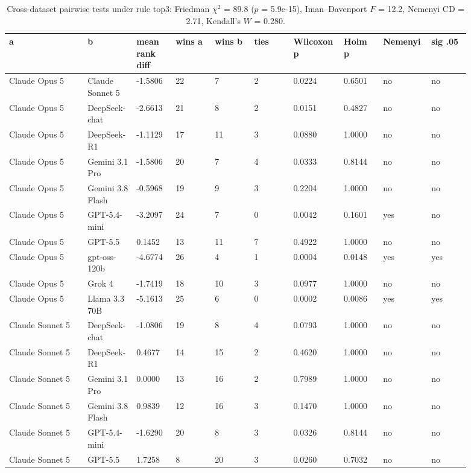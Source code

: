 \begin{landscape}
\tiny
\setlength{\tabcolsep}{3pt}
\begin{longtable}{p{0.162\linewidth}p{0.081\linewidth}p{0.081\linewidth}p{0.081\linewidth}p{0.081\linewidth}p{0.081\linewidth}p{0.081\linewidth}p{0.081\linewidth}p{0.081\linewidth}p{0.081\linewidth}}
\caption{Cross-dataset pairwise tests under rule top3: Friedman $\chi^2$ = 89.8 ($p$ = 5.9e-15), Iman--Davenport $F$ = 12.2, Nemenyi CD = 2.71, Kendall's $W$ = 0.280.}\label{tab:pairwise_top3}\\
\toprule
a & b & mean rank diff & wins a & wins b & ties & Wilcoxon p & Holm p & Nemenyi & sig .05 \\
\midrule
Claude Opus 5 & Claude Sonnet 5 & -1.5806 & 22 & 7 & 2 & 0.0224 & 0.6501 & no & no \\
Claude Opus 5 & DeepSeek-chat & -2.6613 & 21 & 8 & 2 & 0.0151 & 0.4827 & no & no \\
Claude Opus 5 & DeepSeek-R1 & -1.1129 & 17 & 11 & 3 & 0.0880 & 1.0000 & no & no \\
Claude Opus 5 & Gemini 3.1 Pro & -1.5806 & 20 & 7 & 4 & 0.0333 & 0.8144 & no & no \\
Claude Opus 5 & Gemini 3.8 Flash & -0.5968 & 19 & 9 & 3 & 0.2204 & 1.0000 & no & no \\
Claude Opus 5 & GPT-5.4-mini & -3.2097 & 24 & 7 & 0 & 0.0042 & 0.1601 & yes & no \\
Claude Opus 5 & GPT-5.5 & 0.1452 & 13 & 11 & 7 & 0.4922 & 1.0000 & no & no \\
Claude Opus 5 & gpt-oss-120b & -4.6774 & 26 & 4 & 1 & 0.0004 & 0.0148 & yes & yes \\
Claude Opus 5 & Grok 4 & -1.7419 & 18 & 10 & 3 & 0.0977 & 1.0000 & no & no \\
Claude Opus 5 & Llama 3.3 70B & -5.1613 & 25 & 6 & 0 & 0.0002 & 0.0086 & yes & yes \\
Claude Sonnet 5 & DeepSeek-chat & -1.0806 & 19 & 8 & 4 & 0.0793 & 1.0000 & no & no \\
Claude Sonnet 5 & DeepSeek-R1 & 0.4677 & 14 & 15 & 2 & 0.4620 & 1.0000 & no & no \\
Claude Sonnet 5 & Gemini 3.1 Pro & 0.0000 & 13 & 16 & 2 & 0.7989 & 1.0000 & no & no \\
Claude Sonnet 5 & Gemini 3.8 Flash & 0.9839 & 12 & 16 & 3 & 0.1470 & 1.0000 & no & no \\
Claude Sonnet 5 & GPT-5.4-mini & -1.6290 & 20 & 8 & 3 & 0.0326 & 0.8144 & no & no \\
Claude Sonnet 5 & GPT-5.5 & 1.7258 & 8 & 20 & 3 & 0.0260 & 0.7032 & no & no \\

\end{longtable}
\end{landscape}
